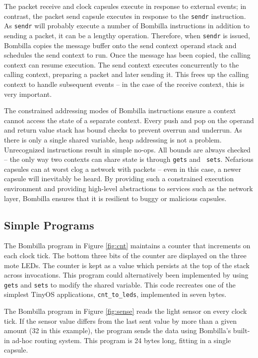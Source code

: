\documentclass[10pt]{article}
\newcommand{\bomb}{Bombilla\xspace}
\begin{document}
The packet receive and clock capsules execute in response to external
events; in contrast, the packet send capsule executes in response to
the {\tt sendr} instruction. As {\tt sendr} will probably execute a
number of \bomb instructions in addition to sending a packet, it can
be a lengthy operation. Therefore, when {\tt sendr} is issued, \bomb
copies the message buffer onto the send context operand stack and
schedules the send context to run. Once the message has been copied,
the calling context can resume execution. The send context executes
concurrently to the calling context, preparing a packet and later
sending it. This frees up the calling context to handle subsequent
events -- in the case of the receive context, this is very important.


The constrained addressing modes of \bomb instructions ensure a
context cannot access the state of a separate context. Every push and
pop on the operand and return value stack has bound checks to prevent
overrun and underrun. As there is only a single shared variable, heap
addressing is not a problem. Unrecognized instructions result in
simple no-ops. All bounds are always checked -- the only way two
contexts can share state is through {\tt gets} and {\tt
sets}. Nefarious capsules can at worst clog a network with packets --
even in this case, a newer capsule will inevitably be heard. By
providing such a constrained execution environment and providing
high-level abstractions to services such as the network layer, \bomb
ensures that it is resilient to buggy or malicious capsules.

\subsection{Simple Programs}
\label{sec:sub:simple}


The \bomb program in Figure \ref{fig:cnt} maintains a counter that
increments on each clock tick. The bottom three bits of the counter
are displayed on the three mote LEDs. The counter is kept as a value
which persists at the top of the stack across invocations. This
program could alternatively been implemented by using {\tt gets} and
{\tt sets} to modify the shared variable.  This code recreates one of
the simplest TinyOS applications, {\tt cnt\_to\_leds}, implemented in
seven bytes.


The \bomb program in Figure \ref{fig:sense} reads the light sensor
on every clock tick. If the sensor value differs from the last sent
value by more than a given amount (32 in this example), the program
sends the data using \bomb's built-in ad-hoc routing system. This
program is 24 bytes long, fitting in a single capsule.
\end{document}
